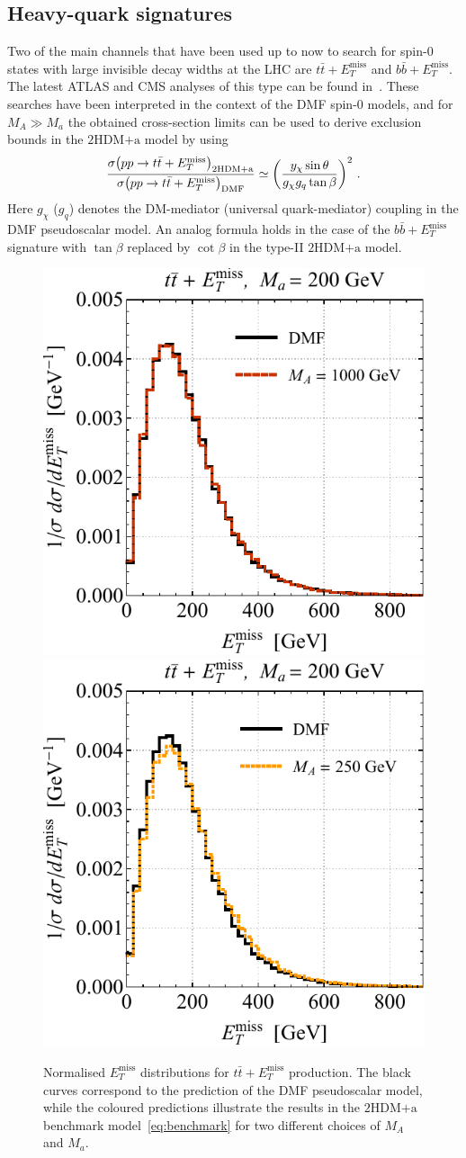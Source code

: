 \documentclass[a4paper, 11pt,notoc]{article}
\newcommand{\MET}{\ensuremath{E_T^\mathrm{miss}}\xspace}
\newcommand{\mA}{\ensuremath{M_{A}}\xspace}
\newcommand{\ma}{\ensuremath{M_{a}}\xspace}
\newcommand{\hdma}{\ensuremath{\textrm{2HDM+a}}\xspace}
\begin{document}
\subsection{Heavy-quark signatures}

Two of the main channels that have been used up to now  to search for spin-0 states with large invisible decay widths at the LHC are $t \bar t + \MET$ and $b \bar b + \MET$. The latest ATLAS and CMS analyses of this type can be found in~\cite{Aaboud:2017rzf,Sirunyan:2018dub}. These searches have been interpreted in the context of the DMF spin-0   models, and for $M_A \gg M_a$ the obtained cross-section limits can be used  to derive exclusion bounds in the \hdma model by using~\cite{Bauer:2017ota}
\begin{equation} \label{eq:rescaling}
\frac{\sigma \! \left ( pp \to t \bar t + \MET\right )_{\hdma}}{\sigma \! \left ( pp \to t \bar t + \MET\right )_{\rm DMF}} \simeq \left ( \frac{y_\chi \sin \theta}{g_\chi g_q \tan \beta} \right )^2 \, .
\end{equation}
Here $g_\chi$ ($g_q$) denotes the DM-mediator (universal quark-mediator) coupling in the DMF  pseudoscalar  model. An analog formula holds in the case of the $b \bar b + \MET$ signature with $\tan \beta$ replaced by $\cot \beta$ in the type-II \hdma model. 

\begin{figure}[t!]
\centering
\includegraphics[height=0.45\textwidth]{ttmetl.pdf} \qquad 
\includegraphics[height=0.45\textwidth]{ttmetr.pdf}
\vspace{2mm}
\caption{\label{fig:ttmet} Normalised $\MET$ distributions for $t \bar t + \MET$ production. The black curves correspond to the prediction of the DMF pseudoscalar   model, while the coloured predictions illustrate the results in the \hdma benchmark model~\eqref{eq:benchmark} for two different choices of $\mA$ and $\ma$.} 
\end{figure}
\end{document}
